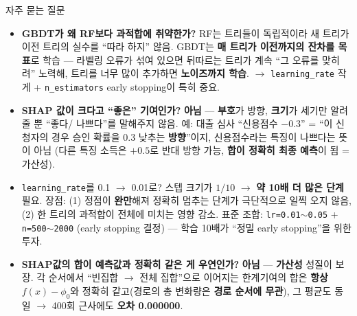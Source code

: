 \begin{frame}{자주 묻는 질문}
  \small
  \begin{itemize}
    \item \textbf{GBDT가 왜 RF보다 과적합에 취약한가?} RF는 트리들이
      독립적이라 새 트리가 이전 트리의 실수를 ``따라 하지'' 않음. GBDT는
      \textbf{매 트리가 이전까지의 잔차를 목표}로 학습 — 라벨링 오류가
      섞여 있으면 뒤따르는 트리가 계속 ``그 오류를 맞히려'' 노력해,
      트리를 너무 많이 추가하면 \textbf{노이즈까지 학습}.
      $\to$ \texttt{learning\_rate} 작게 + \texttt{n\_estimators}
      early stopping이 특히 중요.
    \item \textbf{SHAP 값이 크다고 ``좋은'' 기여인가?} \textbf{아님} —
      \textbf{부호}가 방향, \textbf{크기}가 세기만 알려줄 뿐 ``좋다/
      나쁘다''를 말해주지 않음. 예: 대출 심사 ``신용점수 $-0.3$'' =
      ``이 신청자의 경우 승인 확률을 0.3 낮추는 \textbf{방향}''이지,
      신용점수라는 특징이 나쁘다는 뜻이 아님 (다른 특징 소득은 $+0.5$로
      반대 방향 가능, \textbf{합이 정확히 최종 예측}이 됨 = 가산성).
    \item \texttt{learning\_rate}를 0.1 $\to$ 0.01로? 스텝 크기가
      $1/10$ $\to$ \textbf{약 10배 더 많은 단계} 필요. 장점:
      (1) 정점이 \textbf{완만}해져 정확히 멈추는 단계가 극단적으로
      일찍 오지 않음, (2) 한 트리의 과적합이 전체에 미치는 영향 감소.
      표준 조합: \texttt{lr=0.01$\sim$0.05} + \texttt{n=500$\sim$2000}
      (early stopping 결정) — 학습 10배가 ``정밀 early stopping''을 위한
      투자.
    \item \textbf{SHAP값의 합이 예측값과 정확히 같은 게 우연인가?}
      \textbf{아님} — \textbf{가산성} 성질이 보장. 각 순서에서
      ``빈집합 $\to$ 전체 집합''으로 이어지는 한계기여의 합은
      \textbf{항상} $f(x) - \phi_0$와 정확히 같고(경로의 총 변화량은
      \textbf{경로 순서에 무관}), 그 평균도 동일 $\to$ 400회 근사에도
      \textbf{오차 0.000000}.
  \end{itemize}
\end{frame}
